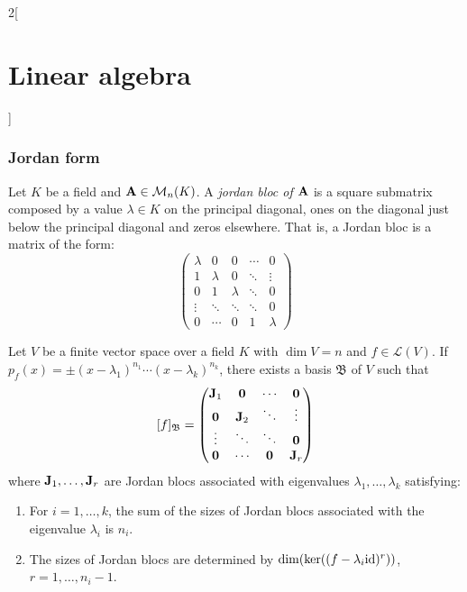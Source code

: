 \documentclass[../../../main.tex]{subfiles}
\begin{document}
\begin{multicols}{2}[\section{Linear algebra}]
  \subsubsection*{Jordan form}
  \begin{definition}
    Let $K$ be a field and $\vb{A}\in\mathcal{M}_n(K)$. A \textit{jordan bloc of $\vb{A}$} is a square submatrix composed by a value $\lambda\in K$ on the principal diagonal, ones on the diagonal just below the principal diagonal and zeros elsewhere. That is, a Jordan bloc is a matrix of the form:
    $$
      \begin{pmatrix}
        \lambda & 0       & 0       & \cdots & 0       \\
        1       & \lambda & 0       & \ddots & \vdots  \\
        0       & 1       & \lambda & \ddots & 0       \\
        \vdots  & \ddots  & \ddots  & \ddots & 0       \\
        0       & \cdots  & 0       & 1      & \lambda
      \end{pmatrix}
    $$
  \end{definition}
  \begin{prop}
    Let $V$ be a finite vector space over a field $K$ with $\dim V=n$ and $f\in\mathcal{L}(V)$. If $p_f(x)=\pm(x-\lambda_1)^{n_1}\cdots(x-\lambda_k)^{n_k}$, there exists a basis $\mathfrak{B}$ of $V$ such that
    $$[f]_{\mathfrak{B}}=
      \begin{pmatrix}
        \vb{J}_1 & \vb{0}   & \cdots        & \vb{0}   \\
        \vb{0}   & \vb{J}_2 & \ddots        & \vdots          \\
        \vdots          & \ddots          & \ddots        & \vb{0}   \\
        \vb{0}   & \cdots          & \vb{0} & \vb{J}_r \\
      \end{pmatrix}
    $$
    where $\vb{J}_1,\ldots,\vb{J}_r$ are Jordan blocs associated with eigenvalues $\lambda_1,\ldots,\lambda_k$ satisfying:
    \begin{enumerate}
      \item\label{LA_diag1} For $i=1,\ldots,k$, the sum of the sizes of Jordan blocs associated with the eigenvalue $\lambda_i$ is $n_i$.
      \item\label{LA_diag2} The sizes of Jordan blocs are determined by $\dim(\ker((f-\lambda_i\mathrm{id})^r))$, $r=1,\ldots,n_i-1$.

\end{enumerate}
\end{prop}
\end{multicols}
\end{document}

